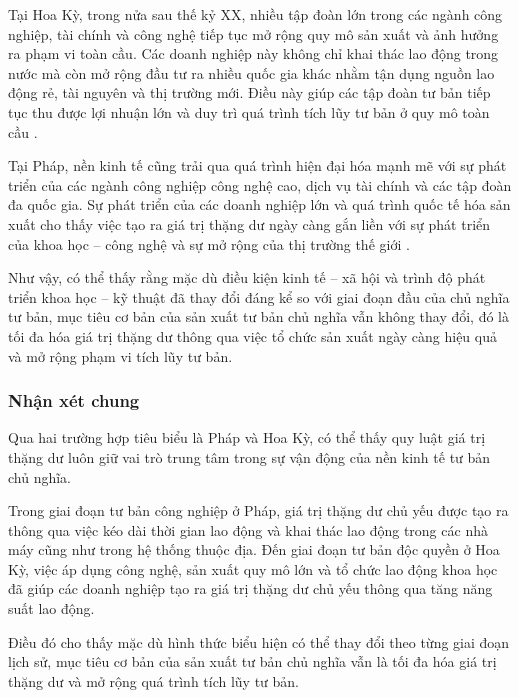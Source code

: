 Tại Hoa Kỳ, trong nửa sau thế kỷ XX, nhiều tập đoàn lớn trong các ngành công nghiệp, tài chính và công nghệ tiếp tục mở rộng quy mô sản xuất và ảnh hưởng ra phạm vi toàn cầu. Các doanh nghiệp này không chỉ khai thác lao động trong nước mà còn mở rộng đầu tư ra nhiều quốc gia khác nhằm tận dụng nguồn lao động rẻ, tài nguyên và thị trường mới. Điều này giúp các tập đoàn tư bản tiếp tục thu được lợi nhuận lớn và duy trì quá trình tích lũy tư bản ở quy mô toàn cầu \cite{LeninImperial}.

Tại Pháp, nền kinh tế cũng trải qua quá trình hiện đại hóa mạnh mẽ với sự phát triển của các ngành công nghiệp công nghệ cao, dịch vụ tài chính và các tập đoàn đa quốc gia. Sự phát triển của các doanh nghiệp lớn và quá trình quốc tế hóa sản xuất cho thấy việc tạo ra giá trị thặng dư ngày càng gắn liền với sự phát triển của khoa học – công nghệ và sự mở rộng của thị trường thế giới \cite{lichsu}.

Như vậy, có thể thấy rằng mặc dù điều kiện kinh tế – xã hội và trình độ phát triển khoa học – kỹ thuật đã thay đổi đáng kể so với giai đoạn đầu của chủ nghĩa tư bản, mục tiêu cơ bản của sản xuất tư bản chủ nghĩa vẫn không thay đổi, đó là tối đa hóa giá trị thặng dư thông qua việc tổ chức sản xuất ngày càng hiệu quả và mở rộng phạm vi tích lũy tư bản.

\subsubsection{Nhận xét chung}

Qua hai trường hợp tiêu biểu là Pháp và Hoa Kỳ, có thể thấy quy luật giá trị thặng dư luôn giữ vai trò trung tâm trong sự vận động của nền kinh tế tư bản chủ nghĩa.

Trong giai đoạn tư bản công nghiệp ở Pháp, giá trị thặng dư chủ yếu được tạo ra thông qua việc kéo dài thời gian lao động và khai thác lao động trong các nhà máy cũng như trong hệ thống thuộc địa. Đến giai đoạn tư bản độc quyền ở Hoa Kỳ, việc áp dụng công nghệ, sản xuất quy mô lớn và tổ chức lao động khoa học đã giúp các doanh nghiệp tạo ra giá trị thặng dư chủ yếu thông qua tăng năng suất lao động.

Điều đó cho thấy mặc dù hình thức biểu hiện có thể thay đổi theo từng giai đoạn lịch sử, mục tiêu cơ bản của sản xuất tư bản chủ nghĩa vẫn là tối đa hóa giá trị thặng dư và mở rộng quá trình tích lũy tư bản.